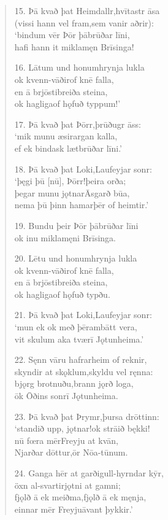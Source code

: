 \documentclass[12pt,letterpaper]{book}
\newcommand{\gap}[1][.25in]{\hspace{#1}}
\begin{document}
\begin{linenumbers}
\begin{verse}
15. Þā kvað þat Heimdallr,\gap hvītastr āsa\\
(vissi hann vel fram,\gap sem vanir aðrir):\\
`bindum vēr Þōr þā\gap brūðar līni,\\
hafi hann it mikla\gap męn Brīsinga!

16. Lātum und honum\gap hrynja lukla\\
ok kvenn-vāðir\gap of knē falla,\\
en ā brjōsti\gap breiða steina,\\
ok hagliga\gap of hǫfuð typpum!'

17. Þā kvað þat Þōrr,\gap þrūðugr āss:\\
`mik munu æsir\gap argan kalla,\\
ef ek bindask læt\gap brūðar līni.'

18. Þā kvað þat Loki,\gap Laufeyjar sonr:\\
`þęgi þū [nū], Þōrr!\gap þeira orða;\\
þegar munu jǫtnar\gap Āsgarð būa,\\
nema þū þinn hamar\gap þēr of heimtir.'

19. Bundu þeir Þōr þā\gap brūðar līni\\
ok inu mikla\gap męni Brīsinga.

20. Lētu und honum\gap hrynja lukla\\
ok kvenn-vāðir\gap of knē falla,\\
en ā brjōsti\gap breiða steina,\\
ok hagliga\gap of hǫfuð typðu.

21. Þā kvað þat Loki,\gap Laufeyjar sonr:\\
`mun ek ok með þēr\gap ambātt vera,\\
vit skulum aka tvær\gap ī Jǫtunheima.'

22. Sęnn vāru hafrar\gap heim of reknir,\\
skyndir at skǫklum,\gap skyldu vel ręnna:\\
bjǫrg brotnuðu,\gap brann jǫrð loga,\\
ōk Ōðins sonr\gap ī Jǫtunheima.

23. Þā kvað þat Þrymr,\gap þursa drōttinn:\\
`standið upp, jǫtnar!\gap ok strāið bękki!\\
nū fœra mēr\gap Freyju at kvān,\\
Njarðar dōttur,\gap ōr Nōa-tūnum.

24. Ganga hēr at garði\gap gull-hyrndar kȳr,\\
öxn al-svartir\gap jǫtni at gamni;\\
fjǫlð ā ek meiðma,\gap fjǫlð ā ek męnja,\\
einnar mēr Freyju\gap āvant þykkir.'


\end{verse}
\end{linenumbers}
\end{document}
